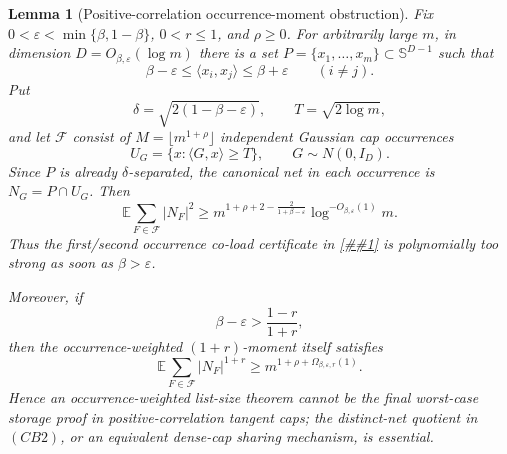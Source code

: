 \documentclass[10pt]{article}
\newcommand{\cref}[1]{\ref{##1}}
\newtheorem{lemma}[theorem]{Lemma}
\theoremstyle{definition}
\newcommand{\E}{\mathbb{E}}
\newcommand{\ip}[2]{\langle #1,#2\rangle}
\begin{document}
\begin{lemma}[Positive-correlation occurrence-moment obstruction]
   \label{lem:positive-correlation-occurrence-obstruction}
   Fix \(0<\varepsilon<\min\{\beta,1-\beta\}\), \(0<r\le1\), and
   \(\rho\ge0\).  For arbitrarily large \(m\), in dimension
   \(D=O_{\beta,\varepsilon}(\log m)\) there is a set
   \(P=\{x_1,\ldots,x_m\}\subset\mathbb S^{D-1}\) such that
   \[
      \beta-\varepsilon
      \le \ip{x_i}{x_j}\le
      \beta+\varepsilon
      \qquad(i\ne j).
      \tag{PC0}
   \]
   Put
   \[
      \delta=\sqrt{2(1-\beta-\varepsilon)},
      \qquad
      T=\sqrt{2\log m},
   \]
   and let \(\mathcal F\) consist of
   \(M=\lfloor m^{1+\rho}\rfloor\) independent Gaussian cap occurrences
   \[
      U_G=\{x:\ip{G}{x}\ge T\},
      \qquad G\sim N(0,I_D).
   \]
   Since \(P\) is already \(\delta\)-separated, the canonical net in each
   occurrence is \(N_G=P\cap U_G\).  Then
   \[
      \E\sum_{F\in\mathcal F}|N_F|^2
      \ge
      m^{1+\rho+2-\frac{2}{1+\beta-\varepsilon}}
      \log^{-O_{\beta,\varepsilon}(1)}m.
      \tag{PC1}
   \]
   Thus the first/second occurrence co-load certificate in
   \cref{lem:occurrence-moments-dominate-dag} is polynomially too strong as
   soon as \(\beta>\varepsilon\).

   Moreover, if
   \[
      \beta-\varepsilon>\frac{1-r}{1+r},
      \tag{PC2}
   \]
   then the occurrence-weighted \((1+r)\)-moment itself satisfies
   \[
      \E\sum_{F\in\mathcal F}|N_F|^{1+r}
      \ge
      m^{1+\rho+\Omega_{\beta,\varepsilon,r}(1)} .
      \tag{PC3}
   \]
   Hence an occurrence-weighted list-size theorem cannot be the final
   worst-case storage proof in positive-correlation tangent caps; the
   distinct-net quotient in \((CB2)\), or an equivalent dense-cap sharing
   mechanism, is essential.
\end{lemma}
\end{document}
